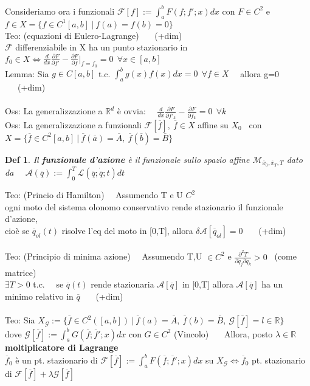 \documentclass{article}
\theoremstyle{unnumbered}
\newtheorem* {theoremT}{Def}
\theoremstyle{unnumbered1}
\newenvironment{defi}{\begin{gBox}\begin{theoremT}}{\end{theoremT}\end{gBox}}
\begin{document}
%
%
%
Consideriamo ora i funzionali $\mathcal{F}[f]:=\int_a^bF(f;f';x)dx$ con $F\in C^2$ e $f\in X=\{f\in C^1[a,b] \ |\ f(a)=f(b)=0 \}$\\
%
Teo: (equazioni di Eulero-Lagrange) \ \ \ (+dim)\\
$\mathcal{F}$ differenziabile in X ha un punto stazionario in $f_0\in X \Longleftrightarrow \frac{d}{dx}\frac{\partial F}{\partial f'}-\frac{\partial F}{\partial f}|_{f=f_0}=0 \ \ \forall x \in [a,b]$ \\
Lemma: Sia $g\in C[a,b]$ t.c. $\int_a^bg(x)f(x)dx=0 \ \ \forall f\in X$ \ \ allora g=0 \ \ \ (+dim)\\ \\
%
%
%
Oss: La generalizzazione a $\mathbb{R}^d$ è ovvia: \ \ $\frac{d}{dx}\frac{\partial F}{\partial f'_k}-\frac{\partial F}{\partial f_k}=0 \ \ \forall k $\\
%
Oss: La generalizzazione a funzionali $\mathcal{F}[\overline{f}], \ \overline{f}\in X$ affine su $X_0$ \ con $X=\{\overline{f}\in C^2[a,b] \ |\ \overline{f}(\overline{a})=\overline{A}, \ \overline{f}(\overline{b})=\overline{B}\}$ \\
%
%
%
\begin{defi}
Il \textbf{funzionale d'azione} è il funzionale sullo spazio affine $\mathcal{M}_{\overline{x}_0,\overline{x}_T,T}$ dato da \ \ $\mathcal{A}(\overline{q}):=\int_0^T\mathcal{L}(\overline{q};\dot{\overline{q}};t)dt$
\end{defi}
%
Teo: (Princio di Hamilton) \ \
Assumendo T e U $C^2$ \\ ogni moto del sistema olonomo conservativo rende stazionario il funzionale d'azione,\\ cioè se $\overline{q}_{ol}(t) $ risolve l'eq del moto in [0,T], allora $\delta\mathcal{A}[\overline{q}_{ol}]=0$ \ \ \ (+dim) \\ \\
%
%
%
Teo: (Principio di minima azione) \ \ Assumendo T,U $\in C^2$ e $\frac{\partial^2T}{\partial\dot{q}_j\partial\dot{q}_k}>0$ \ (come matrice) \\
$\exists T>0 $ t.c. \ \ se $\overline{q}(t)$ rende stazionaria $\mathcal{A}[\overline{q}]$ in [0,T]
allora $\mathcal{A}[\overline{q}]$ ha un minimo relativo in $\overline{q}$  \ \ \ (+dim)\\ \\
%
%
%
Teo: Sia $X_{\mathcal{G}}:=\{ \overline{f}\in C^2([a,b]) \ |\ \overline{f}(a)=\overline{A}, \ \overline{f}(b)=\overline{B}, \ \mathcal{G}[\overline{f}]=l \in \mathbb{R} \}$ \\
\phantom{Teo: }dove $\mathcal{G}[\overline{f}]:=\int_a^bG(\overline{f};\overline{f}';x)dx$ con $G\in C^2$ (Vincolo) \ \ \
Allora, posto $\lambda\in\mathbb{R}$ \textbf{moltiplicatore di Lagrange} \\
\phantom{Teo: }$\overline{f}_0$ è un pt.\! stazionario di $\mathcal{F}[\overline{f}]:=\int_a^bF(\overline{f};\overline{f}';x)dx$ su $X_{\mathcal{G}} \Longleftrightarrow \overline{f}_0$ pt.\! stazionario di $\mathcal{F}[\overline{f}]+\lambda\mathcal{G}[\overline{f}] $
\end{document}
